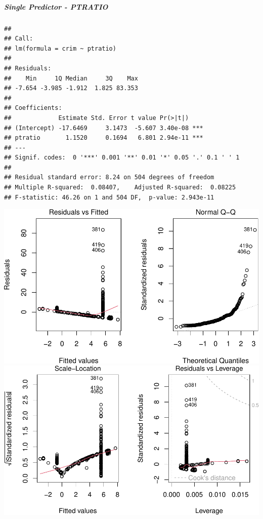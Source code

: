 \documentclass[
]{article}
\begin{document}
\hypertarget{single-predictor---ptratio}{%
\subparagraph{\texorpdfstring{\textbf{Single Predictor -
PTRATIO}}{Single Predictor - PTRATIO}}\label{single-predictor---ptratio}}

\begin{verbatim}
## 
## Call:
## lm(formula = crim ~ ptratio)
## 
## Residuals:
##    Min     1Q Median     3Q    Max 
## -7.654 -3.985 -1.912  1.825 83.353 
## 
## Coefficients:
##             Estimate Std. Error t value Pr(>|t|)    
## (Intercept) -17.6469     3.1473  -5.607 3.40e-08 ***
## ptratio       1.1520     0.1694   6.801 2.94e-11 ***
## ---
## Signif. codes:  0 '***' 0.001 '**' 0.01 '*' 0.05 '.' 0.1 ' ' 1
## 
## Residual standard error: 8.24 on 504 degrees of freedom
## Multiple R-squared:  0.08407,    Adjusted R-squared:  0.08225 
## F-statistic: 46.26 on 1 and 504 DF,  p-value: 2.943e-11
\end{verbatim}

\includegraphics{Disha_Gandhi_Take_Home_Exam_PDF_files/figure-latex/unnamed-chunk-27-1.pdf}
\includegraphics{Disha_Gandhi_Take_Home_Exam_PDF_files/figure-latex/unnamed-chunk-27-2.pdf}
\end{document}
